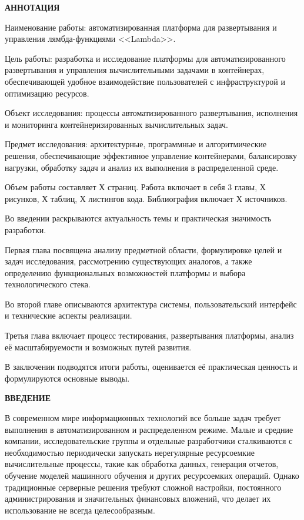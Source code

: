 \newpage
\begin{center}
  \textbf{\large АННОТАЦИЯ}
\end{center}

Наименование работы: автоматизированная платформа для развертывания и управления лямбда-функциями <<Lambda>>.

Цель работы: разработка и исследование платформы для автоматизированного развертывания и управления вычислительными задачами в контейнерах, обеспечивающей удобное взаимодействие пользователей с инфраструктурой и оптимизацию ресурсов.

Объект исследования: процессы автоматизированного развертывания, исполнения и мониторинга контейнеризированных вычислительных задач.

Предмет исследования: архитектурные, программные и алгоритмические решения, обеспечивающие эффективное управление контейнерами, балансировку нагрузки, обработку задач и анализ их выполнения в распределенной среде.

Объем работы составляет Х страниц. 
Работа включает в себя 3 главы, Х рисунков, Х таблиц, Х листингов кода.
Библиография включает Х источников.

Во введении раскрываются актуальность темы и практическая значимость разработки.

Первая глава посвящена анализу предметной области, формулировке целей и задач исследования, рассмотрению существующих аналогов, а также определению функциональных возможностей платформы и выбора технологического стека.

Во второй главе описываются архитектура системы, пользовательский интерфейс и технические аспекты реализации.

Третья глава включает процесс тестирования, развертывания платформы, анализ её масштабируемости и возможных путей развития.

В заключении подводятся итоги работы, оценивается её практическая ценность и формулируются основные выводы.

\onehalfspacing
\setcounter{page}{6}

\newpage
\renewcommand{\contentsname}{\centerline{\large СОДЕРЖАНИЕ}}
\tableofcontents

\newpage
\begin{center}
  \textbf{\large ВВЕДЕНИЕ}
\end{center}

В современном мире информационных технологий все больше задач требует выполнения в автоматизированном и распределенном режиме.
Малые и средние компании, исследовательские группы и отдельные разработчики сталкиваются с необходимостью периодически запускать нерегулярные ресурсоемкие вычислительные процессы, такие как обработка данных, генерация отчетов, обучение моделей машинного обучения и других ресурсоемких операций.
Однако традиционные серверные решения требуют сложной настройки, постоянного администрирования и значительных финансовых вложений, что делает их использование не всегда целесообразным.

